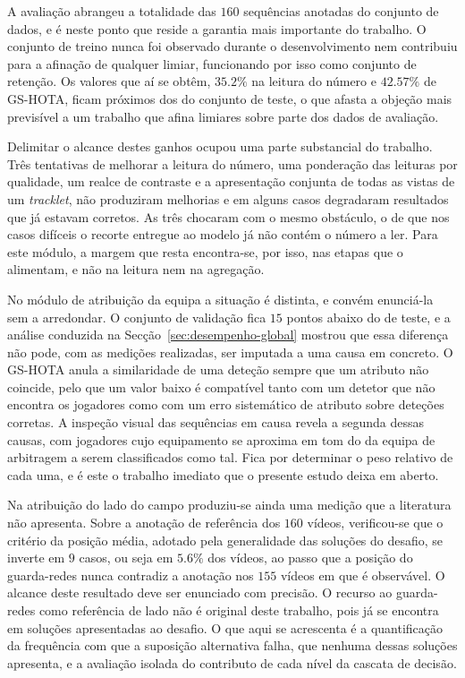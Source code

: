 A avaliação abrangeu a totalidade das $160$ sequências anotadas do conjunto de dados, e é neste ponto que reside a garantia mais importante do trabalho. O conjunto de treino nunca foi observado durante o desenvolvimento nem contribuiu para a afinação de qualquer limiar, funcionando por isso como conjunto de retenção. Os valores que aí se obtêm, $35.2\%$ na leitura do número e $42.57\%$ de GS-HOTA, ficam próximos dos do conjunto de teste, o que afasta a objeção mais previsível a um trabalho que afina limiares sobre parte dos dados de avaliação.

Delimitar o alcance destes ganhos ocupou uma parte substancial do trabalho. Três tentativas de melhorar a leitura do número, uma ponderação das leituras por qualidade, um realce de contraste e a apresentação conjunta de todas as vistas de um \emph{tracklet}, não produziram melhorias e em alguns casos degradaram resultados que já estavam corretos. As três chocaram com o mesmo obstáculo, o de que nos casos difíceis o recorte entregue ao modelo já não contém o número a ler. Para este módulo, a margem que resta encontra-se, por isso, nas etapas que o alimentam, e não na leitura nem na agregação.

No módulo de atribuição da equipa a situação é distinta, e convém enunciá-la sem a arredondar. O conjunto de validação fica $15$ pontos abaixo do de teste, e a análise conduzida na Secção~\ref{sec:desempenho-global} mostrou que essa diferença não pode, com as medições realizadas, ser imputada a uma causa em concreto. O GS-HOTA anula a similaridade de uma deteção sempre que um atributo não coincide, pelo que um valor baixo é compatível tanto com um detetor que não encontra os jogadores como com um erro sistemático de atributo sobre deteções corretas. A inspeção visual das sequências em causa revela a segunda dessas causas, com jogadores cujo equipamento se aproxima em tom do da equipa de arbitragem a serem classificados como tal. Fica por determinar o peso relativo de cada uma, e é este o trabalho imediato que o presente estudo deixa em aberto.

Na atribuição do lado do campo produziu-se ainda uma medição que a literatura não apresenta. Sobre a anotação de referência dos $160$ vídeos, verificou-se que o critério da posição média, adotado pela generalidade das soluções do desafio, se inverte em $9$ casos, ou seja em $5.6\%$ dos vídeos, ao passo que a posição do guarda-redes nunca contradiz a anotação nos $155$ vídeos em que é observável. O alcance deste resultado deve ser enunciado com precisão. O recurso ao guarda-redes como referência de lado não é original deste trabalho, pois já se encontra em soluções apresentadas ao desafio. O que aqui se acrescenta é a quantificação da frequência com que a suposição alternativa falha, que nenhuma dessas soluções apresenta, e a avaliação isolada do contributo de cada nível da cascata de decisão.

